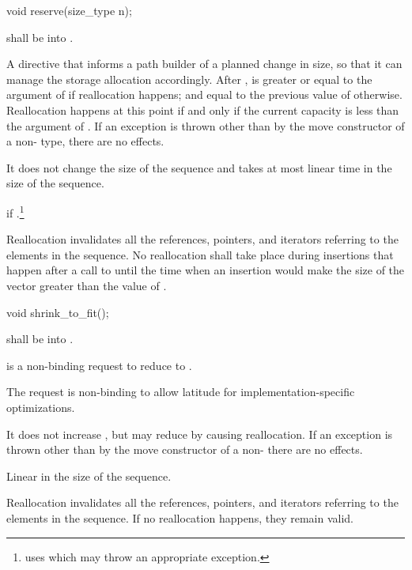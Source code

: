 %
\begin{itemdecl}
void reserve(size_type n);
\end{itemdecl}
\begin{itemdescr}
\pnum
\requires
{} shall be  into .

\pnum
\effects
A directive that informs a path builder of a planned change in size, so that it can manage the storage
allocation accordingly. After ,  is greater or equal to the argument of  if
reallocation happens; and equal to the previous value of  otherwise. Reallocation happens
at this point if and only if the current capacity is less than the argument of . If an exception
is thrown other than by the move constructor of a non- type, there are no effects.

\pnum
\complexity
It does not change the size of the sequence and takes at most linear time in the size of the
sequence.

\pnum
\throws
{} if .\footnote{ uses  which
may throw an appropriate exception.}

\pnum
\remarks
Reallocation invalidates all the references, pointers, and iterators
referring to the elements in the sequence.
No reallocation shall take place during insertions that happen
after a call to
until the time when an insertion would make the size of the vector
greater than the value of
.
\end{itemdescr}

%
\begin{itemdecl}
void shrink_to_fit();
\end{itemdecl}
\begin{itemdescr}
\pnum
\requires
{} shall be  into .

\pnum
\effects
{} is a non-binding request to reduce
 to .
\begin{note}
The request is non-binding to allow latitude for
implementation-specific optimizations.
\end{note}
It does not increase , but may reduce 
by causing reallocation. 
If an exception is thrown other than by the move constructor
of a non-  there are no effects.

\pnum
\complexity Linear in the size of the sequence.

\pnum
\remarks Reallocation invalidates all the references, pointers, and 
iterators referring to the elements in the sequence. If no reallocation 
happens, they remain valid.
\end{itemdescr}

